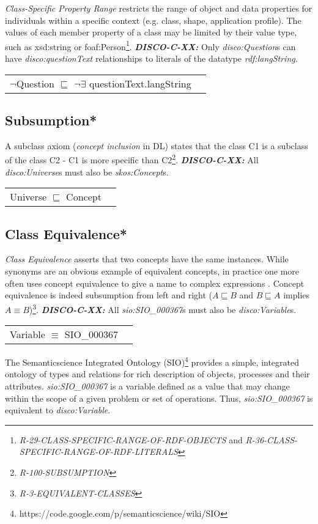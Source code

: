 \documentclass{llncs}
\newenvironment{DL}{
  \vspace{0cm}
  \begin{tabular}{r l}

}{
  \end{tabular}
}
\begin{document}
{\em Class-Specific Property Range} restricts the range of object and data properties for individuals within a specific context (e.g. class, shape, application profile).
The values of each member property of a class may be limited by their value type, such as xsd:string or foaf:Person\footnote{{\em R-29-CLASS-SPECIFIC-RANGE-OF-RDF-OBJECTS} and {\em R-36-CLASS-SPECIFIC-RANGE-OF-RDF-LITERALS}}. 
\textbf{{\em DISCO-C-XX:}} 
Only {\em disco:Question}s can have {\em disco:questionText} relationships to literals of the datatype {\em rdf:langString}.

\begin{DL}
$\neg$Question $\sqsubseteq$ $\neg\exists$ questionText.langString
\end{DL}

\subsection{Subsumption*}

A subclass axiom ({\em concept inclusion} in DL) states that the class C1 is a subclass of the class C2 - C1 is more specific than C2\footnote{{\em R-100-SUBSUMPTION}}.
\textbf{{\em DISCO-C-XX:}} 
All {\em disco:Universe}s must also be {\em skos:Concept}s.

\begin{DL}
Universe $\sqsubseteq$ Concept
\end{DL}

\subsection{Class Equivalence*}

{\em Class Equivalence} asserts that two concepts have the same instances.
While synonyms are an obvious example of equivalent concepts, in practice one more
often uses concept equivalence to give a name to complex expressions \cite{Kroetzsch2012}.
Concept equivalence is indeed subsumption from left and right ($A \sqsubseteq B$ and $B \sqsubseteq A$ implies $A \equiv B$)\footnote{{\em R-3-EQUIVALENT-CLASSES}}.
\textbf{{\em DISCO-C-XX:}}
All {\em sio:SIO\_000367}s must also be {\em disco:Variable}s.

\begin{DL}
Variable $\equiv$ SIO\_000367
\end{DL}

The Semanticscience Integrated Ontology (SIO)\footnote{https://code.google.com/p/semanticscience/wiki/SIO} provides a simple, integrated ontology of types and relations for rich description of objects, processes and their attributes.
{\em sio:SIO\_000367} is a variable defined as a value that may change within the scope of a given problem or set of operations.
Thus, {\em sio:SIO\_000367} is equivalent to {\em disco:Variable}.
\end{document}
